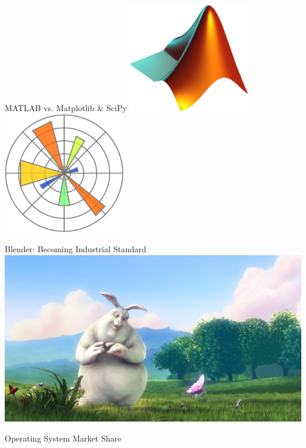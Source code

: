 \documentclass[pdf]{beamer}
\begin{document}
\begin{frame}{MATLAB vs. Matplotlib \& SciPy}
  \hfill
  \includegraphics[width=0.4\textwidth]{matlab.png}
  \hfill
  \includegraphics[width=0.4\textwidth]{matplotlib.png}
  \hfill
\end{frame}

\begin{frame}{Blender: Becoming Industrial Standard}
  \includegraphics[width=\textwidth]{big-buck-bunny.jpg}
\end{frame}

\begin{frame}{Operating System Market Share}
\end{frame}
\end{document}

